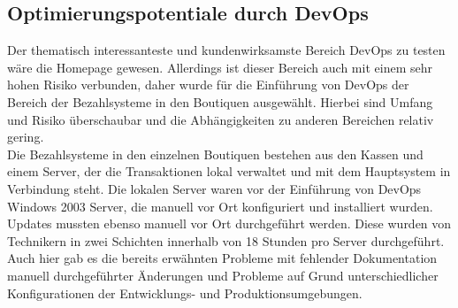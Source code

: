 \subsection{Optimierungspotentiale durch DevOps}
Der thematisch interessanteste und kundenwirksamste Bereich DevOps zu testen wäre die Homepage gewesen. Allerdings ist dieser Bereich auch mit einem sehr hohen Risiko verbunden, daher wurde für die Einführung von DevOps der Bereich der Bezahlsysteme in den Boutiquen ausgewählt. Hierbei sind Umfang und Risiko überschaubar und die Abhängigkeiten zu anderen Bereichen relativ gering.\\
Die Bezahlsysteme in den einzelnen Boutiquen bestehen aus den Kassen und einem Server, der die Transaktionen lokal verwaltet und mit dem Hauptsystem in Verbindung steht. Die lokalen Server waren vor der Einführung von DevOps Windows 2003 Server, die manuell vor Ort konfiguriert und installiert wurden. Updates mussten ebenso manuell vor Ort durchgeführt werden. Diese wurden von Technikern in zwei Schichten innerhalb von 18 Stunden pro Server durchgeführt. Auch hier gab es die bereits erwähnten Probleme mit fehlender Dokumentation manuell durchgeführter Änderungen und Probleme auf Grund unterschiedlicher Konfigurationen der Entwicklungs- und Produktionsumgebungen. \parencite[Vgl.][S. 5]{Reed:2014}\\ 
